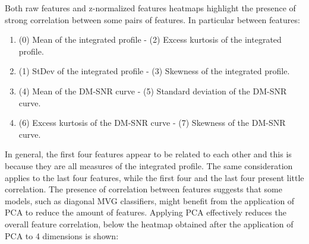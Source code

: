 \documentclass[12pt,a4paper]{article}
\begin{document}
Both raw features and z-normalized features heatmaps highlight the presence of strong correlation between some pairs of features. In particular between features:

\begin{enumerate}
    \item (0) Mean of the integrated profile - (2) Excess kurtosis of the integrated profile.
    \item (1) StDev of the integrated profile - (3) Skewness of the integrated profile.
    \item (4) Mean of the DM-SNR curve - (5) Standard deviation of the DM-SNR curve.
    \item (6) Excess kurtosis of the DM-SNR curve - (7) Skewness of the DM-SNR curve.
\end{enumerate}

In general, the first four features appear to be related to each other and this is because they are all measures of the integrated profile.
The same consideration applies to the last four features, while the first four and the last four present little correlation.
The presence of correlation between features suggests that some models, such as diagonal MVG classifiers, might benefit from the application of PCA to reduce the amount of features.
Applying PCA effectively reduces the overall feature correlation, below the heatmap obtained after the application of PCA to 4 dimensions is shown: \\
\end{document}
